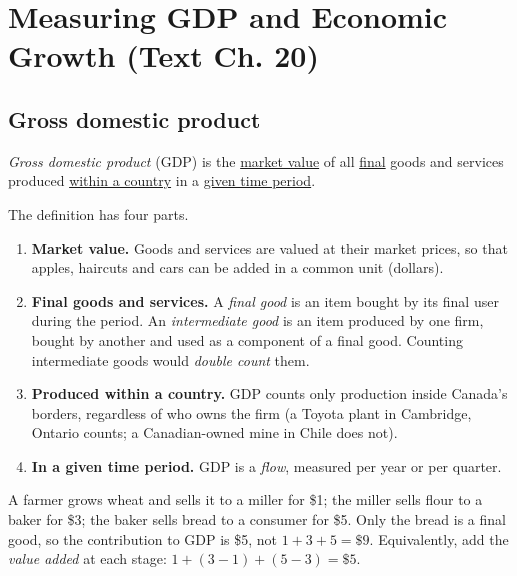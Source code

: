 \chapter{Measuring GDP and Economic Growth (Text Ch. 20)}

\section{Gross domestic product}

\begin{definition}[GDP]
\emph{Gross domestic product} (GDP) is the \underline{market value} of all
\underline{final} goods and services produced \underline{within a country} in a
\underline{given time period}.
\end{definition}

The definition has four parts.
\begin{enumerate}
  \item \textbf{Market value.} Goods and services are valued at their market prices, so
        that apples, haircuts and cars can be added in a common unit (dollars).
  \item \textbf{Final goods and services.} A \emph{final good} is an item bought by its
        final user during the period. An \emph{intermediate good} is an item produced by one
        firm, bought by another and used as a component of a final good. Counting
        intermediate goods would \emph{double count} them.
  \item \textbf{Produced within a country.} GDP counts only production inside Canada's
        borders, regardless of who owns the firm (a Toyota plant in Cambridge, Ontario
        counts; a Canadian-owned mine in Chile does not).
  \item \textbf{In a given time period.} GDP is a \emph{flow}, measured per year or per
        quarter.
\end{enumerate}

\begin{example}
A farmer grows wheat and sells it to a miller for \$1; the miller sells flour to a baker
for \$3; the baker sells bread to a consumer for \$5. Only the bread is a final good, so
the contribution to GDP is \$5, not $1 + 3 + 5 = \$9$. Equivalently, add the \emph{value
added} at each stage: $1 + (3 - 1) + (5 - 3) = \$5$.
\end{example}

